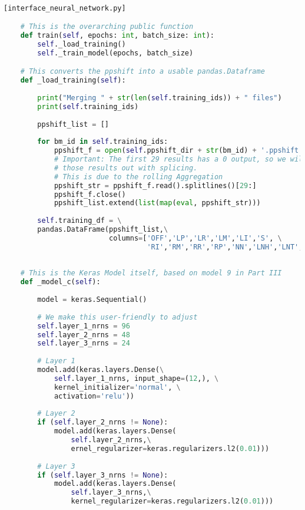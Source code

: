 \begin{lstlisting}[language=Python]

[interface_neural_network.py]

    # This is the overarching public function
    def train(self, epochs: int, batch_size: int):
        self._load_training()
        self._train_model(epochs, batch_size)

    # This converts the ppshift into a usable pandas.Dataframe
    def _load_training(self): 
             
        print("Merging " + str(len(self.training_ids)) + " files")
        print(self.training_ids)
    
        ppshift_list = []
        
        for bm_id in self.training_ids:
            ppshift_f = open(self.ppshift_dir + str(bm_id) + '.ppshift', 'r')
            # Important: The first 29 results has a 0 output, so we will cut
            # those results out with splicing.
            # This is due to the rolling Aggregation
            ppshift_str = ppshift_f.read().splitlines()[29:]
            ppshift_f.close()   
            ppshift_list.extend(list(map(eval, ppshift_str)))
            
        self.training_df = \
        pandas.DataFrame(ppshift_list,\
                         columns=['OFF','LP','LR','LM','LI','S', \
                                  'RI','RM','RR','RP','NN','LNH','LNT','MED'])
                                  
                                  
    # This is the Keras Model itself, based on model 9 in Part III
    def _model_c(self):
        
        model = keras.Sequential()
        
        # We make this user-friendly to adjust
        self.layer_1_nrns = 96
        self.layer_2_nrns = 48
        self.layer_3_nrns = 24
        
        # Layer 1
        model.add(keras.layers.Dense(\
            self.layer_1_nrns, input_shape=(12,), \
            kernel_initializer='normal', \
            activation='relu'))
            
        # Layer 2 
        if (self.layer_2_nrns != None):
            model.add(keras.layers.Dense(
                self.layer_2_nrns,\
                ernel_regularizer=keras.regularizers.l2(0.01)))
             
        # Layer 3   
        if (self.layer_3_nrns != None):
            model.add(keras.layers.Dense(
                self.layer_3_nrns,\
                kernel_regularizer=keras.regularizers.l2(0.01)))
              

\end{lstlisting}
